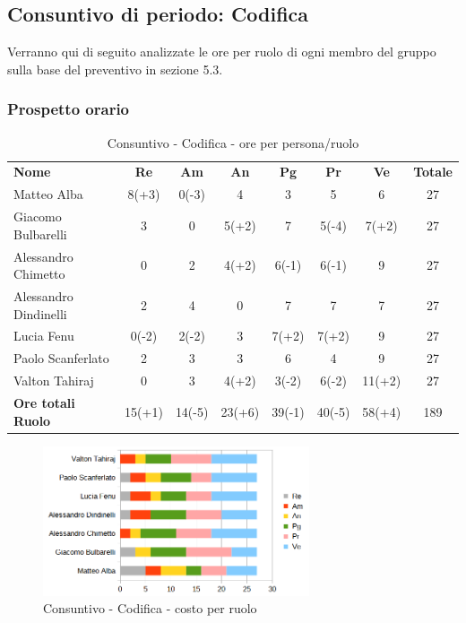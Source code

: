 \newpage

\subsection{Consuntivo di periodo: Codifica }
Verranno qui di seguito analizzate le ore per ruolo di ogni membro del gruppo sulla base del preventivo in sezione 5.3.
\subsubsection{Prospetto orario}
\begin{table} [h!]
	\begin{center}
		\begin{tabular} { m{3.5cm} c c c c c c c }
			\rowcolor{lightgray}
			\textbf{Nome} & \textbf{Re} & \textbf{Am} & \textbf{An} & \textbf{Pg} & \textbf{Pr} & \textbf{Ve} & \textbf{Totale} \\
			Matteo Alba               & 8(+3)      & 0(-3)    & 4      & 3  & 5  & 6      & 27 \\
			Giacomo Bulbarelli        & 3     & 0     & 5(+2)  & 7  & 5(-4)  & 7(+2)      & 27 \\
			Alessandro Chimetto       & 0     & 2    & 4(+2)       & 6(-1)  & 6(-1)  & 9     & 27 \\
			Alessandro Dindinelli     & 2     & 4    & 0       & 7  & 7  & 7  & 27 \\
			Lucia Fenu                & 0(-2)  & 2(-2)  & 3      & 7(+2)   & 7(+2)   & 9      & 27 \\
			Paolo Scanferlato         & 2      & 3      & 3      & 6       & 4       & 9      & 27 \\
			Valton Tahiraj            & 0      & 3      & 4(+2)  & 3(-2)   & 6(-2)   & 11(+2) & 27\\
			\textbf{Ore totali Ruolo} & 15(+1) & 14(-5) & 23(+6) & 39(-1)  & 40(-5)  & 58(+4) & 189\\
		\end{tabular}
		\caption{Consuntivo - Codifica  - ore per persona/ruolo}
	\end{center}
\end{table}
	\begin{figure} [h!]
	\centering
	\includegraphics[width=0.7\textwidth]{res/img/grafici/consuntivo-barre-tb.png}
	\caption{Consuntivo - Codifica  - costo per ruolo} 
\end{figure}
\newpage
